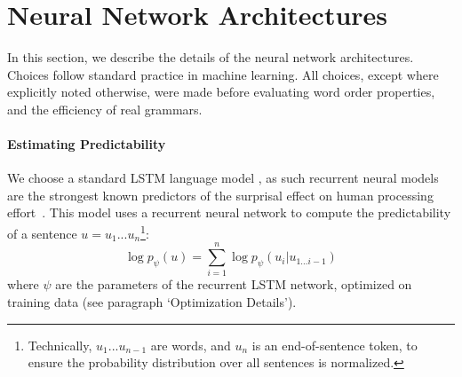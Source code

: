 \documentclass[10pt,twoside,lineno]{article}
\begin{document}







\section{Neural Network Architectures}\label{sec:neural-architectures}

In this section, we describe the details of the neural network architectures.
Choices follow standard practice in machine learning.
All choices, except where explicitly noted otherwise, were made before evaluating word order properties, and the efficiency of real grammars.


\paragraph{Estimating Predictability}
We choose a standard LSTM language model \citep{goldberg2017neural, hochreiter1997long}, as such recurrent neural models are the strongest known predictors of the surprisal effect on human processing effort~\cite{frank2011insensitivity,goodkind2018predictive}.
This model uses a recurrent neural network to compute the predictability of a sentence $u = u_1...u_n$\footnote{Technically, $u_1...u_{n-1}$ are words, and $u_n$ is an end-of-sentence token, to ensure the probability distribution over all sentences is normalized.}:
\begin{equation}
\log p_\psi(u) = \sum_{i=1}^n \log p_\psi(u_i|u_{1\dots i-1})
\end{equation}
where $\psi$ are the parameters of the recurrent LSTM network, optimized on training data (see paragraph `Optimization Details').
\end{document}

